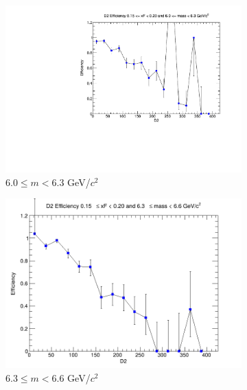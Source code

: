 \documentclass[11pt]{article}
\begin{document}
\begin{figure}[p]
\begin{subfigure}[b]{0.32\textwidth}
        \includegraphics[width=\textwidth]{./kTrackerEfficiencyPlots/D2_Efficiency_xF3_mass6.pdf}
        \caption{$6.0 \leq m < 6.3$ GeV/$c^2$}
    \end{subfigure}\hfill
    \begin{subfigure}[b]{0.32\textwidth}
        \centering
        \includegraphics[width=\textwidth]{./kTrackerEfficiencyPlots/D2_Efficiency_xF3_mass7.png}
        \caption{$6.3 \leq m < 6.6$ GeV/$c^2$}
    \end{subfigure}\hfill
    \begin{subfigure}[b]{0.32\textwidth}
        \centering

\end{subfigure}
\end{figure}
\end{document}
